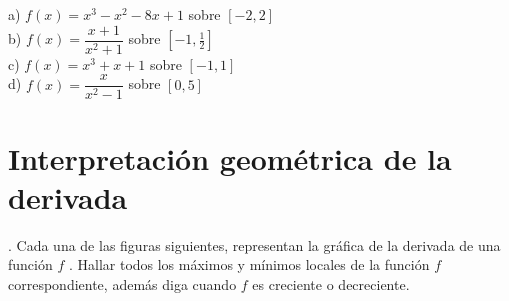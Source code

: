 \documentclass[letterpaper]{article}
\begin{document}
a) $ f(x) = x^{3} -x^{2} -8x +1$ sobre $ [-2,2] $\\


b) $ f(x) = \dfrac{x+1}{x^{2}+1}$ sobre $ [-1,\frac{1}{2}] $\\


c) $ f(x) = x^{3} +x +1$ sobre $ [-1,1] $\\


d) $ f(x) = \dfrac{x}{x^{2} - 1}$ sobre $ [0,5] $\\


\section*{Interpretación geométrica de la derivada}

. Cada una de las figuras siguientes, representan la gráfica de la derivada de una función $ f $ . Hallar todos los máximos y mínimos locales de la función $ f $ correspondiente, además diga cuando $ f $ es creciente o decreciente.\\
\end{document}
